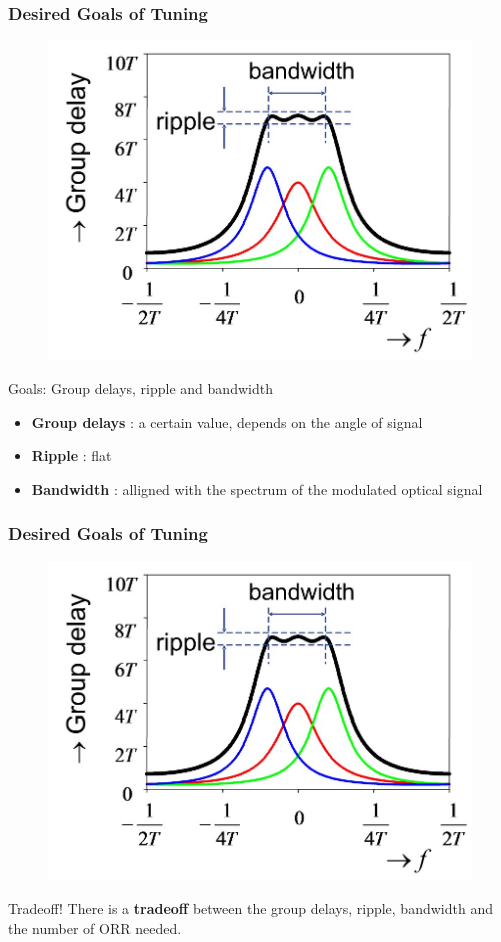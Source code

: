 \documentclass{beamer}
\begin{document}
\begin{frame}\frametitle{Desired Goals of Tuning}
	\begin{figure}
			\centering
			\includegraphics[width=0.45\linewidth]{images/ORR2}
			\label{fig:projlayers}
	\end{figure}
	\begin{block}{Goals: Group delays, ripple and bandwidth}
		\begin{itemize}
		\item \textbf{Group delays} : a certain value, depends on the angle of signal\\
		\item \textbf{Ripple} : flat\\
		\item \textbf{Bandwidth} : alligned with the spectrum of the modulated optical signal
		\end{itemize}
	\end{block}
\end{frame}

\begin{frame}\frametitle{Desired Goals of Tuning}
	\begin{figure}
			\centering
			\includegraphics[width=0.45\linewidth]{images/ORR2}
			\label{fig:projlayers}
	\end{figure}
	\begin{alertblock}{Tradeoff!}
		There is a \textbf{tradeoff} between the group delays, ripple, bandwidth and the number of ORR needed.
	\end{alertblock}
\end{frame}
\end{document}
